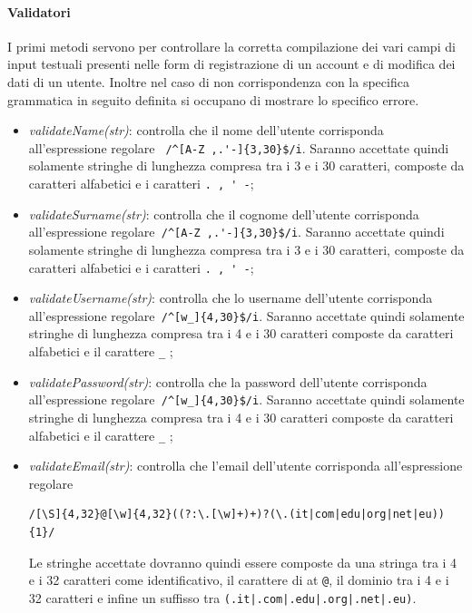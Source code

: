 \paragraph{Validatori}
I primi metodi servono per controllare la corretta compilazione dei vari campi di input testuali presenti nelle form di registrazione di un account e di modifica dei dati di un utente. Inoltre nel caso di non corrispondenza con la specifica grammatica in seguito definita si occupano di mostrare lo specifico errore.
\begin{itemize}
    \item \textit{validateName(str)}: controlla che il nome dell'utente corrisponda all'espressione regolare \verb| /^[A-Z ,.'-]{3,30}$/i|. Saranno accettate quindi solamente stringhe di lunghezza compresa tra i 3 e i 30 caratteri, composte da caratteri alfabetici e i caratteri \verb|. , ' -|;
    \item \textit{validateSurname(str)}: controlla che il cognome dell'utente corrisponda all'espressione regolare\verb| /^[A-Z ,.'-]{3,30}$/i|. Saranno accettate quindi solamente stringhe di lunghezza compresa tra i 3 e i 30 caratteri, composte da caratteri alfabetici e i caratteri \verb|. , ' -|;
    \item \textit{validateUsername(str)}: controlla che lo username dell'utente corrisponda all'espressione regolare\verb| /^[w_]{4,30}$/i|. Saranno accettate quindi solamente stringhe di lunghezza compresa tra i 4 e i 30 caratteri composte da caratteri alfabetici e il carattere \verb|_| ;
    \item \textit{validatePassword(str)}: controlla che la password dell'utente corrisponda all'espressione regolare\verb| /^[w_]{4,30}$/i|. Saranno accettate quindi solamente stringhe di lunghezza compresa tra i 4 e i 30 caratteri composte da caratteri alfabetici e il carattere \verb|_| ;
    \item \textit{validateEmail(str)}: controlla che l'email dell'utente corrisponda all'espressione regolare\begin{verbatim}/[\S]{4,32}@[\w]{4,32}((?:\.[\w]+)+)?(\.(it|com|edu|org|net|eu)){1}/\end{verbatim}Le stringhe accettate dovranno quindi essere composte da una stringa tra i 4 e i 32 caratteri come identificativo, il carattere di at \verb|@|, il dominio tra i 4 e i 32 caratteri e infine un suffisso tra \texttt{(.it|.com|.edu|.org|.net|.eu)}.
\end{itemize}
